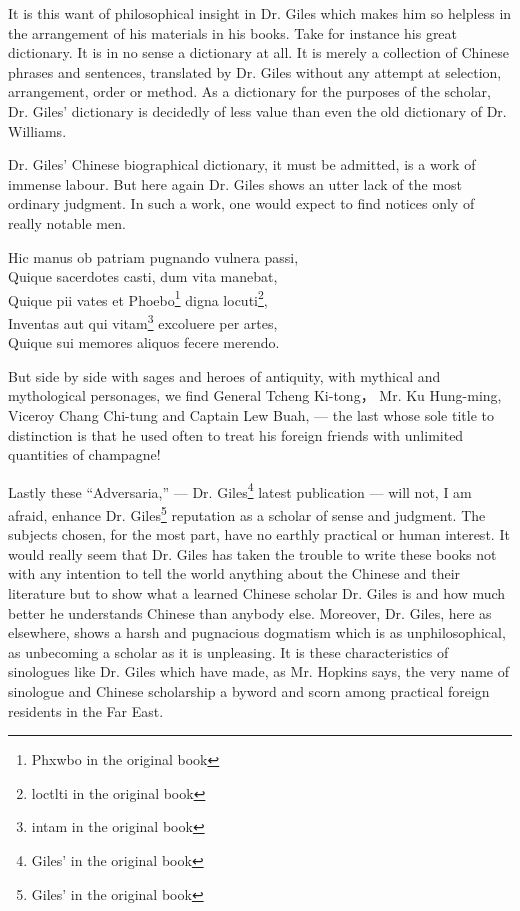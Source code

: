 It is this want of philosophical insight in Dr. Giles which makes him so helpless in the arrangement of his materials in his books.
Take for instance his great dictionary.
It is in no sense a dictionary at all.
It is merely a collection of Chinese phrases and sentences, translated by Dr. Giles without any attempt at selection, arrangement, order or method.
As a dictionary for the purposes of the scholar, Dr. Giles' dictionary is decidedly of less value than even the old dictionary of Dr. Williams.

Dr. Giles' Chinese biographical dictionary, it must be admitted, is a work of immense labour.
But here again Dr. Giles shows an utter lack of the most ordinary judgment.
In such a work, one would expect to find notices only of really notable men.
\begin{center}
    Hic manus ob patriam pugnando vulnera passi, \\
    Quique sacerdotes casti, dum vita manebat, \\
    Quique pii vates et Phoebo\footnote{Phxwbo in the original book} digna locuti\footnote{loctlti in the original book}, \\
    Inventas aut qui vitam\footnote{intam in the original book} excoluere per artes, \\
    Quique sui memores aliquos fecere merendo.
\end{center}

But side by side with sages and heroes of antiquity, with mythical and mythological personages, we find General Tcheng Ki-tong， Mr. Ku Hung-ming, Viceroy Chang Chi-tung and Captain Lew Buah, --- the last whose sole title to distinction is that he used often to treat his foreign friends with unlimited quantities of champagne!

Lastly these ``Adversaria,'' --- Dr. Giles\footnote{Giles' in the original book} latest publication --- will not, I am afraid, enhance Dr. Giles\footnote{Giles' in the original book} reputation as a scholar of sense and judgment.
The subjects chosen, for the most part, have no earthly practical or human interest.
It would really seem that Dr. Giles has taken the trouble to write these books not with any intention to tell the world anything about the Chinese and their literature but to show what a learned Chinese scholar Dr. Giles is and how much better he understands Chinese than anybody else.
Moreover, Dr. Giles, here as elsewhere, shows a harsh and pugnacious dogmatism which is as unphilosophical, as unbecoming a scholar as it is unpleasing.
It is these characteristics of sinologues like Dr. Giles which have made, as Mr. Hopkins says, the very name of sinologue and Chinese scholarship a byword and scorn among practical foreign residents in the Far East.


